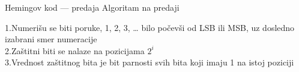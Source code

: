 \begin{frame}[label=06-s028]{Hemingov kod — predaja}
\fontsize{10}{12}\selectfont\setlength{\parskip}{2pt} Algoritam na predaji\par\vspace{1mm}
1.\quad Numerišu se biti poruke, 1, 2, 3, … bilo počevši od LSB ili MSB, uz dosledno izabrani smer numeracije\\
2.\quad Zaštitni biti se nalaze na pozicijama $2^i$\\
3.\quad Vrednost zaštitnog bita je bit parnosti svih bita koji imaju 1 na istoj poziciji\par\vspace{1mm}
\centering
\end{frame}
